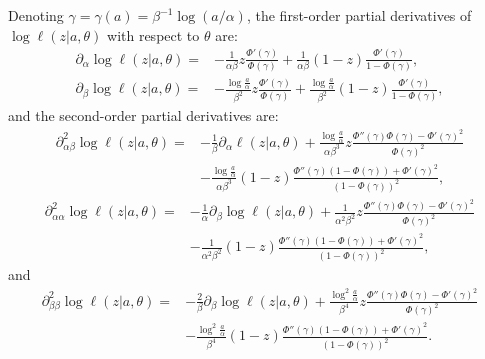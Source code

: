 Denoting $\gamma=\gamma(a)=\beta^{-1}\log({a}/{\alpha})$, the first-order partial derivatives of $\log \ell(z|a,\theta)$ with respect to $\theta$ are:
    \begin{align}
        {\partial_\alpha}\log \ell(z|a,\theta) =& -\frac{1}{\alpha\beta}z\frac{\Phi'(\gamma)}{\Phi(\gamma)} + \frac{1}{\alpha\beta}(1-z)\frac{\Phi'(\gamma)}{1-\Phi(\gamma)} , \\
        {\partial_\beta}\log \ell(z|a,\theta) =& -\frac{\log\frac{a}{\alpha}}{\beta^2}z\frac{\Phi'(\gamma)}{\Phi(\gamma)}+ \frac{\log\frac{a}{\alpha}}{\beta^2}(1-z)\frac{\Phi'(\gamma)}{1-\Phi(\gamma)} ,
    \end{align}
    and the second-order partial derivatives are:
    \begin{align}
        {\partial^2_{\alpha\beta}}\log \ell(z|a,\theta)  =&-\frac{1}{\beta}{\partial_\alpha}\ell(z|a,\theta) 
        + \frac{\log\frac{a}{\alpha}}{\alpha\beta^3}z\frac{\Phi''(\gamma)\Phi(\gamma)-\Phi'(\gamma)^2}{\Phi(\gamma)^2}\label{eq:partialalphbet}\\
        &
            - \frac{\log\frac{a}{\alpha}}{\alpha\beta^3}(1-z)\frac{\Phi''(\gamma)(1-\Phi(\gamma))+\Phi'(\gamma)^2}{(1-\Phi(\gamma))^2} ,\nonumber
    \end{align}
    \begin{align}
        {\partial^2_{\alpha\alpha}}\log \ell(z|a,\theta)  =&  -\frac{1}{\alpha}{\partial_\beta}\log \ell(z|a,\theta) 
        + \frac{1}{\alpha^2\beta^2}z\frac{\Phi''(\gamma)\Phi(\gamma)-\Phi'(\gamma)^2}{\Phi(\gamma)^2}\label{eq:partial2alph}\\
        &
            - \frac{1}{\alpha^2\beta^2}(1-z)\frac{\Phi''(\gamma)(1-\Phi(\gamma))+\Phi'(\gamma)^2}{(1-\Phi(\gamma))^2} , \nonumber
    \end{align}  
    and
    \begin{align}
        {\partial^2_{\beta\beta}}\log \ell(z|a,\theta) =& 
        -\frac{2}{\beta}{\partial_\beta}\log \ell(z|a,\theta) 
        + \frac{\log^2\frac{a}{\alpha}}{\beta^4}z\frac{\Phi''(\gamma)\Phi(\gamma)-\Phi'(\gamma)^2}{\Phi(\gamma)^2} \label{eq:partial2bet}\\
        &
        - \frac{\log^2\frac{a}{\alpha}}{\beta^4}(1-z)\frac{\Phi''(\gamma)(1-\Phi(\gamma))+\Phi'(\gamma)^2}{(1-\Phi(\gamma))^2}.\nonumber
    \end{align}
    
    
    
